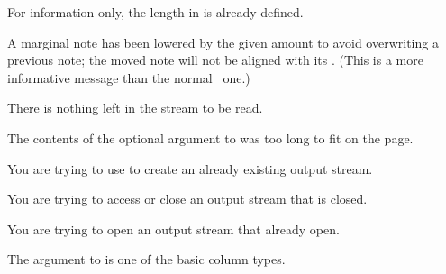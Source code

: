 \begin{plainlist}
\item[]

    For information only, the length in \cmd{\providelength} 
is already defined.



\item[]

    A marginal note has been lowered by the given amount to avoid overwriting
a previous note; the moved note will not be aligned with its \cmd{\marginpar}.
(This is a more informative message than the normal \ltx\ one.)

\item[]

    There is nothing left in the stream to be read.

\item[]

     The contents of the optional argument to \cmd{\twocolumn} was too
long to fit on the page.

\item[] 

     You are trying to use \cmd{\newoutputstream} to create an already existing
output stream.

\item[]

    You are trying to access or close an output stream that is closed.

\item[]

    You are trying to open an output stream that already open.

\item[]

    The argument to \cmd{\newcolumntype} is one of the basic column types.




\end{plainlist}

